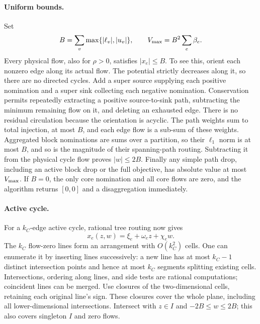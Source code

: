 \paragraph{Uniform bounds.}
Set
\begin{equation}
 B=\sum_v\max\{|\ell_v|,|u_v|\},\qquad
 V_{\max}=B^2\sum_e\beta_e.
 \label{eq:a-cac-bounds}
\end{equation}
Every physical flow, also for $\rho>0$, satisfies $|x_e|\le B$.
To see this, orient each nonzero edge along its actual flow. The
potential strictly decreases along it, so there are no directed cycles. Add a super
source supplying each positive nomination and a super sink collecting
each negative nomination. Conservation permits repeatedly extracting
a positive source-to-sink path, subtracting the minimum remaining flow
on it, and deleting an exhausted edge. There is no residual circulation
because the orientation is acyclic. The path weights sum to total
injection, at most $B$, and each edge flow is a sub-sum of these weights.
Aggregated block nominations are sums over a partition, so their
$\ell_1$ norm is at most $B$, and so is the magnitude of their
spanning-path routing. Subtracting it from the physical cycle
flow proves $|w|\le2B$. Finally any simple path drop, including an active
block drop or the full objective, has absolute value at most $V_{\max}$.
If $B=0$, the only core nomination and all core flows are zero, and the
algorithm returns $[0,0]$ and a disaggregation immediately.

\paragraph{Active cycle.}
For a $k_C$-edge active cycle, rational tree routing now gives
\begin{equation}
 x_e(z,w)=\xi_e+\omega_e z+\chi_ew.
 \label{eq:a-cac-active-flow}
\end{equation}
The $k_C$ flow-zero lines form an arrangement with $O(k_C^2)$ cells. One
can enumerate it by inserting lines successively: a new line has at
most $k_C-1$ distinct intersection points and hence at most $k_C$ segments
splitting existing cells. Intersections, ordering along lines, and
side tests are rational computations; coincident lines can be merged.
Use closures of the two-dimensional cells, retaining each original
line's sign. These closures cover the whole plane, including all
lower-dimensional intersections. Intersect with $z\in I$ and
$-2B\le w\le2B$; this also covers singleton $I$ and zero flows.

